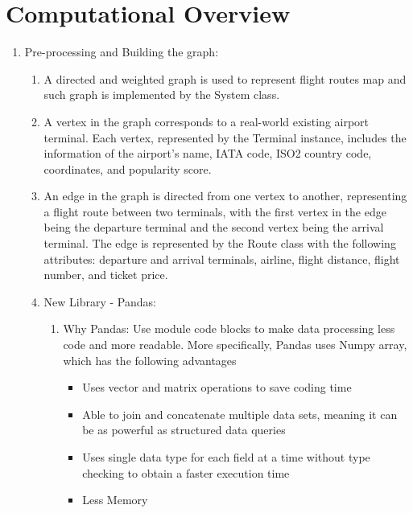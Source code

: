 \documentclass[fontsize=11pt]{article}
\begin{document}
\section*{Computational Overview}
\begin{enumerate}
\item Pre-processing and Building the graph: 
    \begin{enumerate}
        \item A directed and weighted graph is used to represent flight routes map and such graph is implemented by the System class.
        \item A vertex in the graph corresponds to a real-world existing airport terminal. Each vertex, represented by the Terminal instance, includes the information of the airport's name, IATA code, ISO2 country code, coordinates, and popularity score.
        \item An edge in the graph is directed from one vertex to another, representing a flight route between two terminals, with the first vertex in the edge being the departure terminal and the second vertex being the arrival terminal. The edge is represented by the Route class with the following attributes: departure and arrival terminals, airline, flight distance, flight number, and ticket price.
        
        \item New Library - Pandas: 
        \begin{enumerate}
            \item Why Pandas: Use module code blocks to make data processing less code and more readable. More specifically, Pandas uses Numpy array, which has the following advantages \cite{pandas} \cite{james} 
            \begin{itemize}
                \item Uses vector and matrix operations to save coding time
                \item Able to join and concatenate multiple data sets, meaning it can be as powerful as structured data queries
                \item Uses single data type for each field at a time without type checking to obtain a faster execution time
                \item Less Memory
            \end{itemize}


\end{enumerate}
\end{enumerate}
\end{enumerate}
\end{document}
